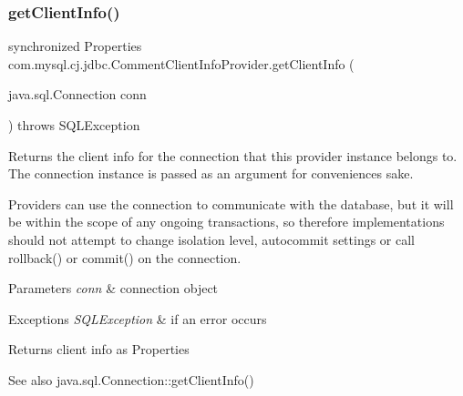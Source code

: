 \mbox{\label{classcom_1_1mysql_1_1cj_1_1jdbc_1_1_comment_client_info_provider_a6e6267820c12e2f4180b01e3053c9c64}} 
\subsubsection{\texorpdfstring{get\+Client\+Info()}{getClientInfo()}\hspace{0.1cm}{\footnotesize\ttfamily [1/2]}}
{\footnotesize\ttfamily synchronized Properties com.\+mysql.\+cj.\+jdbc.\+Comment\+Client\+Info\+Provider.\+get\+Client\+Info (\begin{DoxyParamCaption}\item[{java.\+sql.\+Connection}]{conn }\end{DoxyParamCaption}) throws S\+Q\+L\+Exception}

Returns the client info for the connection that this provider instance belongs to. The connection instance is passed as an argument for convenience\textquotesingle{}s sake.

Providers can use the connection to communicate with the database, but it will be within the scope of any ongoing transactions, so therefore implementations should not attempt to change isolation level, autocommit settings or call rollback() or commit() on the connection.


\begin{DoxyParams}{Parameters}
{\em conn} & connection object \\
\hline
\end{DoxyParams}

\begin{DoxyExceptions}{Exceptions}
{\em S\+Q\+L\+Exception} & if an error occurs \\
\hline
\end{DoxyExceptions}
\begin{DoxyReturn}{Returns}
client info as Properties 
\end{DoxyReturn}
\begin{DoxySeeAlso}{See also}
java.\+sql.\+Connection\+::get\+Client\+Info() 
\end{DoxySeeAlso}


